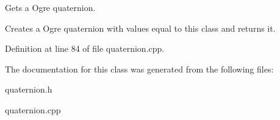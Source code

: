 Gets a Ogre quaternion. 

Creates a Ogre quaternion with values equal to this class and returns it. 

Definition at line 84 of file quaternion.cpp.



The documentation for this class was generated from the following files:\begin{DoxyCompactItemize}
\item 
quaternion.h\item 
quaternion.cpp\end{DoxyCompactItemize}
